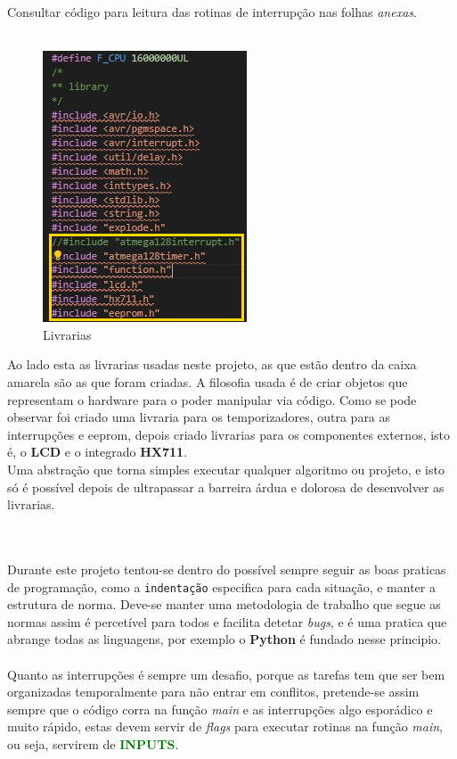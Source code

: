 Consultar código para leitura das rotinas de interrupção nas folhas \textit{anexas}.
\\
\\
\begin{minipage}{.40\linewidth}
\begin{figure}[H]
	\flushleft
	\captionsetup{justification=raggedright,singlelinecheck=false}
	\includegraphics[scale=0.9]{./image/PESTA/Code/Livrarias.jpg}
	\caption{Livrarias}
	\label{Livrarias}
\end{figure}
\end{minipage}
\begin{minipage}{.6\linewidth}
Ao lado esta as livrarias usadas neste projeto, as que estão dentro da caixa amarela são as que foram criadas.
A filosofia usada é de criar objetos que representam o hardware para o poder manipular via código. Como se pode observar foi criado uma livraria para os temporizadores, outra para as interrupções e \ac{eeprom}, depois criado livrarias para os componentes externos, isto é, o \textbf{LCD} e o integrado \textbf{HX711}. \\
Uma abstração que torna simples executar qualquer algoritmo ou projeto, e isto só é possível depois de ultrapassar a barreira árdua e dolorosa de desenvolver as livrarias.
\\
\\
\\
\end{minipage}
Durante este projeto tentou-se dentro do possível sempre seguir as boas praticas de programação, como a \texttt{indentação} especifica para cada situação, e manter a estrutura de norma. Deve-se manter uma metodologia de trabalho que segue as normas assim é percetível para todos e facilita detetar \textit{bugs}, e é uma pratica que abrange todas as linguagens, por exemplo o \textbf{Python} é fundado nesse principio.
\\
\\
Quanto as interrupções é sempre um desafio, porque as tarefas tem que ser bem organizadas temporalmente para não entrar em conflitos, pretende-se assim sempre que o código corra na função \textit{main} e as interrupções algo esporádico e muito rápido, estas devem servir de \textit{flags} para executar rotinas na função \textit{main}, ou seja, servirem de \textbf{\textcolor{green}{INPUTS}}.
\newpage
